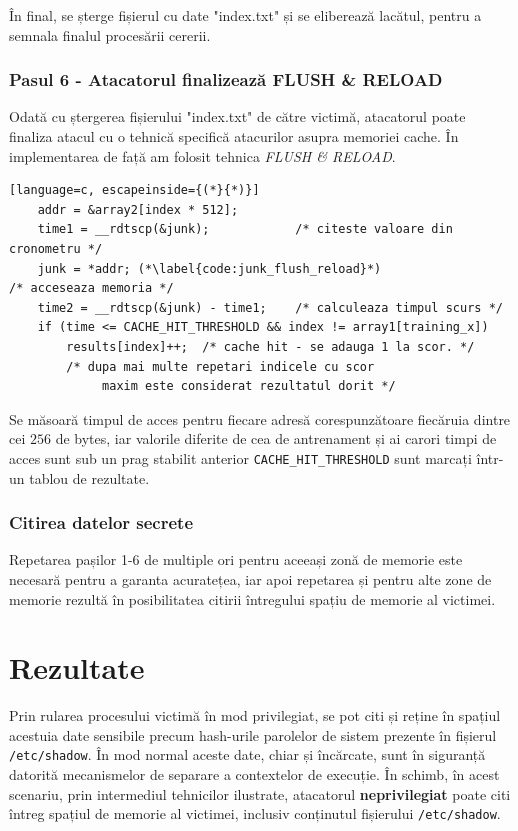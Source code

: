 În final, se șterge fișierul cu date "index.txt" și se eliberează
lacătul, pentru a semnala finalul procesării cererii.

\subsubsection{Pasul 6 - Atacatorul finalizează FLUSH \& RELOAD}
\label{subsec:pas6}

Odată cu ștergerea fișierului "index.txt" de către victimă, atacatorul poate
finaliza atacul cu o tehnică specifică atacurilor asupra memoriei cache. În
implementarea de față am folosit tehnica \emph{FLUSH \& RELOAD}.

\begin{lstlisting}[language=c, escapeinside={(*}{*)}]
	addr = &array2[index * 512];
	time1 = __rdtscp(&junk);            /* citeste valoare din cronometru */
	junk = *addr; (*\label{code:junk_flush_reload}*)                      /* acceseaza memoria */
	time2 = __rdtscp(&junk) - time1;    /* calculeaza timpul scurs */
	if (time <= CACHE_HIT_THRESHOLD && index != array1[training_x])
		results[index]++;  /* cache hit - se adauga 1 la scor. */
		/* dupa mai multe repetari indicele cu scor
			 maxim este considerat rezultatul dorit */
\end{lstlisting}

Se măsoară timpul de acces pentru fiecare adresă corespunzătoare fiecăruia dintre
cei $256$ de bytes, iar valorile diferite de cea de antrenament și ai carori timpi
de acces sunt sub un prag stabilit anterior \texttt{CACHE\_HIT\_THRESHOLD} sunt 
marcați într-un tablou de rezultate.

\subsubsection{Citirea datelor secrete}

Repetarea pașilor 1-6 de multiple ori pentru aceeași zonă de memorie este necesară pentru a garanta
acuratețea, iar apoi repetarea și pentru alte zone de memorie rezultă în posibilitatea
citirii întregului spațiu de memorie al victimei.

\section{Rezultate}

Prin rularea procesului victimă în mod privilegiat, se pot citi și reține în
spațiul acestuia date sensibile precum hash-urile parolelor de sistem prezente
în fișierul \texttt{/etc/shadow}. În mod normal aceste date, chiar și încărcate,
sunt în siguranță datorită mecanismelor de separare a contextelor de execuție.
În schimb, în acest scenariu, prin intermediul tehnicilor ilustrate, atacatorul
\textbf{neprivilegiat} poate citi întreg spațiul de memorie al victimei, inclusiv
conținutul fișierului \texttt{/etc/shadow}.

